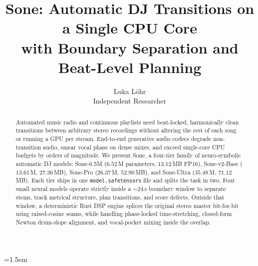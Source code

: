 \documentclass[11pt]{article}
\title{Sone: Automatic DJ Transitions on a Single CPU Core\\with Boundary Separation and Beat-Level Planning}
\author{Luka L\"ohr\\Independent Researcher}
\date{}
\newcommand{\sone}{Sone}
\newcommand{\op}[1]{\texttt{#1}}
\begin{document}
\emergencystretch=1.5em
\maketitle

\begin{abstract}
Automated music radio and continuous playlists need beat-locked, harmonically clean transitions between arbitrary stereo recordings without altering the rest of each song or running a GPU per stream. End-to-end generative audio codecs degrade non-transition audio, smear vocal phase on dense mixes, and exceed single-core CPU budgets by orders of magnitude. We present \sone{}, a four-tier family of neuro-symbolic automatic DJ models: Sone-6.5M ($6.52$\,M parameters, $13.12$\,MB FP16), Sone-v2-Base ($13.61$\,M, $27.36$\,MB), Sone-Pro ($26.37$\,M, $52.90$\,MB), and Sone-Ultra ($35.48$\,M, $71.12$\,MB). Each tier ships in one \op{model.safetensors} file and splits the task in two. Four small neural models operate strictly inside a $\sim 24$\,s boundary window to separate stems, track metrical structure, plan transitions, and score defects. Outside that window, a deterministic Rust DSP engine splices the original stereo master bit-for-bit using raised-cosine seams, while handling phase-locked time-stretching, closed-form Newton drum-slope alignment, and vocal-pocket mixing inside the overlap.


\end{abstract}
\end{document}
